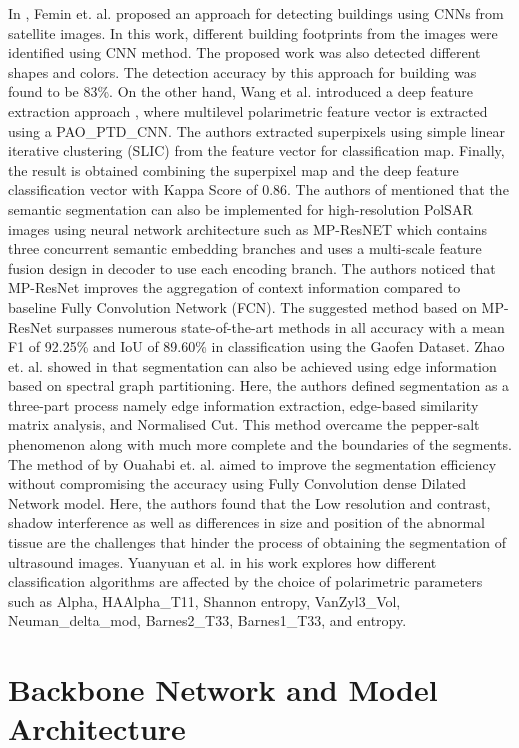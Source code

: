 \documentclass[a4paper,12pt]{spieman}  %
\begin{document}
\begin{spacing}{1}
In \cite{femin2020accurate}, Femin et. al. proposed an approach for detecting buildings using CNNs from satellite images. In this work, different building footprints from the images were identified using CNN method. The proposed work was also detected different shapes and colors. The detection accuracy by this approach for building was found to be 83\%. On the other hand, Wang et al. introduced a deep feature extraction approach \cite{PAOPTDCNN}, where multilevel polarimetric feature vector is extracted using a PAO\_PTD\_CNN. The authors extracted superpixels using simple linear iterative clustering (SLIC) from the feature vector for classification map. Finally, the result is obtained combining the superpixel map and the deep feature classification vector with Kappa Score of 0.86.
The authors of \cite{Ding_2021} mentioned that the semantic segmentation can also be implemented for high-resolution PolSAR images using neural network architecture such as MP-ResNET which contains three concurrent semantic embedding branches and uses a multi-scale feature fusion design in decoder to use each encoding branch. The authors noticed that MP-ResNet improves the aggregation of context information compared to baseline Fully Convolution Network (FCN). The suggested method based on MP-ResNet surpasses numerous state-of-the-art methods in all accuracy with a mean F1 of 92.25\% and IoU of 89.60\% in classification using the Gaofen Dataset. Zhao et. al. showed in \cite{zhao2013segmentation} that segmentation can also be achieved using edge information based on spectral graph partitioning. Here, the authors defined segmentation as a three-part process namely edge information extraction, edge-based similarity matrix analysis, and Normalised Cut. This method overcame the pepper-salt phenomenon along with much more complete and the boundaries of the segments. The method of \cite{ouahabi2021deep} by Ouahabi et. al. aimed to improve the segmentation efficiency without compromising the accuracy using Fully Convolution dense Dilated Network model. Here, the authors found that the Low resolution and contrast, shadow interference as well as differences in size and position of the abnormal tissue are the challenges that hinder the process of obtaining the segmentation of ultrasound images. Yuanyuan et al. in his work \cite{rs61212575} explores how different classification algorithms are affected by the choice of polarimetric parameters such as Alpha, HAAlpha\_T11, Shannon entropy, VanZyl3\_Vol, Neuman\_delta\_mod, Barnes2\_T33, Barnes1\_T33, and entropy. \section{Backbone Network and Model Architecture}

\end{spacing}
\end{document}
